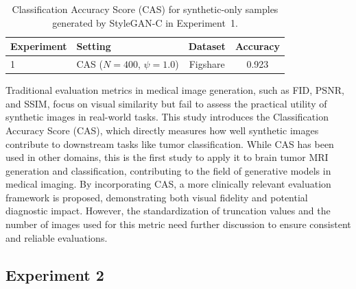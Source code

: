 \begin{table}[H]
\centering
\small
\caption{Classification Accuracy Score (CAS) for synthetic-only samples generated by StyleGAN-C in Experiment~1.}
\label{tab:global_summary_exp1_cas}
\begin{tabular}{llcc}
\toprule
Experiment & Setting & Dataset & Accuracy \\
\midrule
1 & CAS ($N=400$, $\psi = 1.0$) & Figshare & 0.923 \\
\bottomrule
\end{tabular}
\end{table}

Traditional evaluation metrics in medical image generation, such as FID, PSNR, and SSIM, focus on visual similarity but fail to assess the practical utility of synthetic images in real-world tasks. This study introduces the Classification Accuracy Score (CAS), which directly measures how well synthetic images contribute to downstream tasks like tumor classification. While CAS has been used in other domains, this is the first study to apply it to brain tumor MRI generation and classification, contributing to the field of generative models in medical imaging. By incorporating CAS, a more clinically relevant evaluation framework is proposed, demonstrating both visual fidelity and potential diagnostic impact. However, the standardization of truncation values and the number of images used for this metric need further discussion to ensure consistent and reliable evaluations.




\subsection{Experiment 2}


